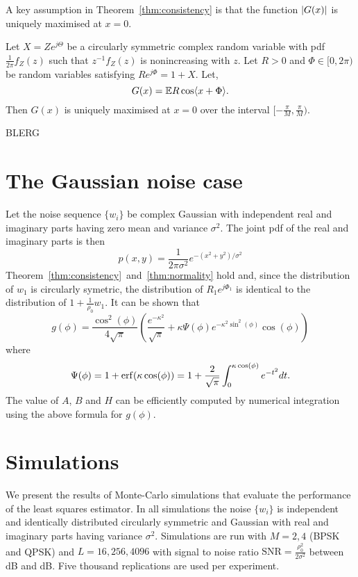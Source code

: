 \documentclass[conference]{IEEEtran}
\begin{document}
A key assumption in Theorem~\ref{thm:consistency} is that the function ${\left\vert G(x) \right\vert}$ is uniquely maximised at $x = 0$.

\begin{lemma}
Let $X = Z e^{j\Theta}$ be a circularly symmetric complex random variable with pdf $\tfrac{1}{2\pi}f_Z(z)$ such that $z^{-1} f_Z(z)$ is nonincreasing with $z$.  Let $R > 0$ and $\Phi \in [0, 2\pi)$ be random variables satisfying $R e^{j\Phi} = 1 + X$.  Let,
\[
G(x) = {\mathbb E} R \cos\langle x + \Phi \rangle.
\]
Then $G(x)$ is uniquely maximised at $x=0$ over the interval $[-\tfrac{\pi}{M},\tfrac{\pi}{M})$.
\end{lemma}
\begin{IEEEproof}
BLERG
\end{IEEEproof}


\section{The Gaussian noise case}

Let the noise sequence $\{w_i\}$ be complex Gaussian with independent real and imaginary parts having zero mean and variance $\sigma^2$.  The joint pdf of the real and imaginary parts is then
\[
p(x,y) = \frac{1}{2\pi\sigma^2}e^{-(x^2 + y^2)/\sigma^2}
\]
Theorem~\ref{thm:consistency}~and~\ref{thm:normality} hold and, since the distribution of $w_1$ is circularly symetric, the distribution of $R_1e^{j\Phi_1}$ is identical to the distribution of $1 + \frac{1}{\rho_0} w_1$.
It can be shown that
\[
g(\phi) = \frac{\cos^2(\phi)}{4\sqrt{\pi}}\left( \frac{e^{-\kappa^2} }{\sqrt{\pi}} + \kappa \Psi(\phi)  e^{-\kappa^2\sin^2(\phi)}\cos(\phi) \right)
\]
where
\[
\Psi(\phi) = 1 + \operatorname{erf}(\kappa \cos(\phi)) = 1 + \frac{2}{\sqrt{\pi}}\int_0^{\kappa \cos(\phi)} e^{-t^2} dt .
\]
The value of $A$, $B$ and $H$ can be efficiently computed by numerical integration using the above formula for $g(\phi)$.


\section{Simulations}\label{sec:simulations}

We present the results of Monte-Carlo simulations that evaluate the performance of the least squares estimator.  In all simulations the noise $\{w_i\}$ is independent and identically distributed circularly symmetric and Gaussian with real and imaginary parts having variance $\sigma^2$.  Simulations are run with $M=2,4$ (BPSK and QPSK) and $L=16,256,4096$ with signal to noise ratio $\text{SNR} = \tfrac{\rho_0^2}{2\sigma^2}$ between \unit[-20]{dB} and \unit[20]{dB}.  Five thousand replications are used per experiment.  
\end{document}
